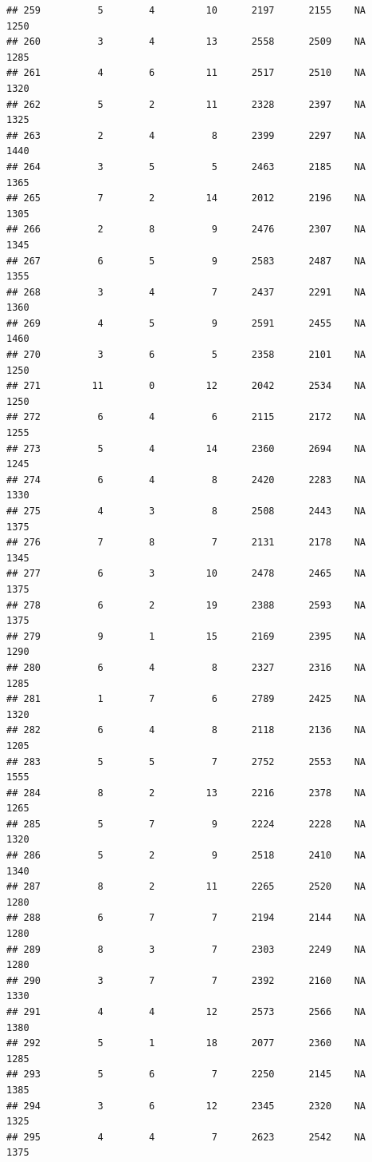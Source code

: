 \documentclass[]{book}
\begin{document}
\begin{verbatim}
## 259          5        4         10      2197      2155    NA    1250
## 260          3        4         13      2558      2509    NA    1285
## 261          4        6         11      2517      2510    NA    1320
## 262          5        2         11      2328      2397    NA    1325
## 263          2        4          8      2399      2297    NA    1440
## 264          3        5          5      2463      2185    NA    1365
## 265          7        2         14      2012      2196    NA    1305
## 266          2        8          9      2476      2307    NA    1345
## 267          6        5          9      2583      2487    NA    1355
## 268          3        4          7      2437      2291    NA    1360
## 269          4        5          9      2591      2455    NA    1460
## 270          3        6          5      2358      2101    NA    1250
## 271         11        0         12      2042      2534    NA    1250
## 272          6        4          6      2115      2172    NA    1255
## 273          5        4         14      2360      2694    NA    1245
## 274          6        4          8      2420      2283    NA    1330
## 275          4        3          8      2508      2443    NA    1375
## 276          7        8          7      2131      2178    NA    1345
## 277          6        3         10      2478      2465    NA    1375
## 278          6        2         19      2388      2593    NA    1375
## 279          9        1         15      2169      2395    NA    1290
## 280          6        4          8      2327      2316    NA    1285
## 281          1        7          6      2789      2425    NA    1320
## 282          6        4          8      2118      2136    NA    1205
## 283          5        5          7      2752      2553    NA    1555
## 284          8        2         13      2216      2378    NA    1265
## 285          5        7          9      2224      2228    NA    1320
## 286          5        2          9      2518      2410    NA    1340
## 287          8        2         11      2265      2520    NA    1280
## 288          6        7          7      2194      2144    NA    1280
## 289          8        3          7      2303      2249    NA    1280
## 290          3        7          7      2392      2160    NA    1330
## 291          4        4         12      2573      2566    NA    1380
## 292          5        1         18      2077      2360    NA    1285
## 293          5        6          7      2250      2145    NA    1385
## 294          3        6         12      2345      2320    NA    1325
## 295          4        4          7      2623      2542    NA    1375

\end{verbatim}
\end{document}
